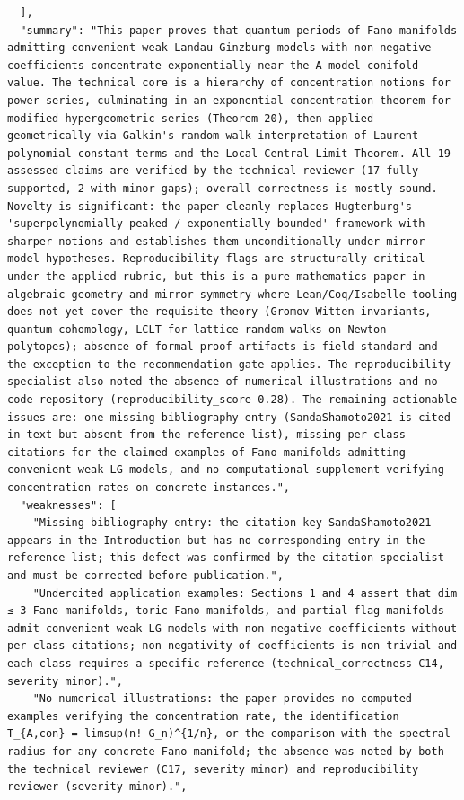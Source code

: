 \documentclass[11pt]{article}
\begin{document}
\begin{verbatim}
  ],
  "summary": "This paper proves that quantum periods of Fano manifolds admitting convenient weak Landau–Ginzburg models with non-negative coefficients concentrate exponentially near the A-model conifold value. The technical core is a hierarchy of concentration notions for power series, culminating in an exponential concentration theorem for modified hypergeometric series (Theorem 20), then applied geometrically via Galkin's random-walk interpretation of Laurent-polynomial constant terms and the Local Central Limit Theorem. All 19 assessed claims are verified by the technical reviewer (17 fully supported, 2 with minor gaps); overall correctness is mostly sound. Novelty is significant: the paper cleanly replaces Hugtenburg's 'superpolynomially peaked / exponentially bounded' framework with sharper notions and establishes them unconditionally under mirror-model hypotheses. Reproducibility flags are structurally critical under the applied rubric, but this is a pure mathematics paper in algebraic geometry and mirror symmetry where Lean/Coq/Isabelle tooling does not yet cover the requisite theory (Gromov–Witten invariants, quantum cohomology, LCLT for lattice random walks on Newton polytopes); absence of formal proof artifacts is field-standard and the exception to the recommendation gate applies. The reproducibility specialist also noted the absence of numerical illustrations and no code repository (reproducibility_score 0.28). The remaining actionable issues are: one missing bibliography entry (SandaShamoto2021 is cited in-text but absent from the reference list), missing per-class citations for the claimed examples of Fano manifolds admitting convenient weak LG models, and no computational supplement verifying concentration rates on concrete instances.",
  "weaknesses": [
    "Missing bibliography entry: the citation key SandaShamoto2021 appears in the Introduction but has no corresponding entry in the reference list; this defect was confirmed by the citation specialist and must be corrected before publication.",
    "Undercited application examples: Sections 1 and 4 assert that dim ≤ 3 Fano manifolds, toric Fano manifolds, and partial flag manifolds admit convenient weak LG models with non-negative coefficients without per-class citations; non-negativity of coefficients is non-trivial and each class requires a specific reference (technical_correctness C14, severity minor).",
    "No numerical illustrations: the paper provides no computed examples verifying the concentration rate, the identification T_{A,con} = limsup(n! G_n)^{1/n}, or the comparison with the spectral radius for any concrete Fano manifold; the absence was noted by both the technical reviewer (C17, severity minor) and reproducibility reviewer (severity minor).",

\end{verbatim}
\end{document}
